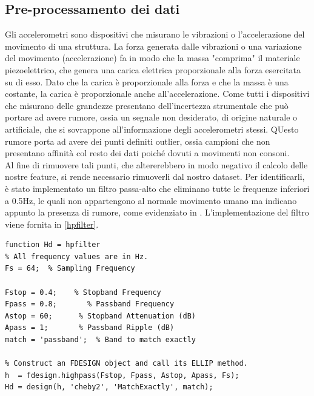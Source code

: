 \subsection{Pre-processamento dei dati}
Gli accelerometri sono dispositivi che misurano le vibrazioni o l'accelerazione del movimento di una struttura. La forza generata dalle vibrazioni o una variazione del movimento (accelerazione) fa in modo che la massa "comprima" il materiale piezoelettrico, che genera una carica elettrica proporzionale alla forza esercitata su di esso. Dato che la carica è proporzionale alla forza e che la massa è una costante, la carica è proporzionale anche all'accelerazione. Come tutti i dispositivi che misurano delle grandezze presentano dell'incertezza strumentale che può portare ad avere rumore, ossia un segnale non desiderato, di origine naturale o artificiale, che si sovrappone all'informazione degli accelerometri stessi. QUesto rumore porta ad avere dei punti definiti outlier, ossia campioni che non presentano affinità col resto dei dati poiché dovuti a movimenti non consoni.\\
Al fine di rimuovere tali punti, che altererebbero in modo negativo il calcolo delle nostre feature, si rende necessario rimuoverli dal nostro dataset. Per identificarli, è stato implementato un filtro passa-alto che eliminano tutte le frequenze inferiori a 0.5Hz, le quali non appartengono al normale movimento umano ma indicano appunto la presenza di rumore, come evidenziato in \cite{21}. L'implementazione del filtro viene fornita in \ref{hpfilter}.
\begin{lstlisting}[style=Matlab-editor,frame=single, caption=hpfilter, label=hpfilter]  % Start your code-block
function Hd = hpfilter
% All frequency values are in Hz.
Fs = 64;  % Sampling Frequency

Fstop = 0.4;    % Stopband Frequency
Fpass = 0.8;       % Passband Frequency
Astop = 60;      % Stopband Attenuation (dB)
Apass = 1;       % Passband Ripple (dB)
match = 'passband';  % Band to match exactly

% Construct an FDESIGN object and call its ELLIP method.
h  = fdesign.highpass(Fstop, Fpass, Astop, Apass, Fs);
Hd = design(h, 'cheby2', 'MatchExactly', match);
\end{lstlisting}
